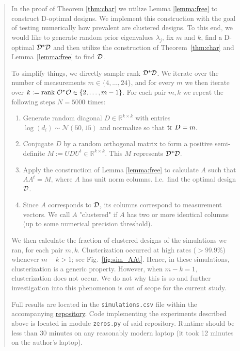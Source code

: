 \begin{quote}
  In the proof of Theorem \ref{thm:char} we utilize Lemma
  \ref{lemma:free} to construct D-optimal designs. We implement this
  construction with the goal of testing numerically how prevalent are
  clustered designs. To this end, we would like to generate random
  prior eigenvalues $\lambda_j$, fix $m$ and $k$, find a D-optimal
  $\mathcal{D}^*\mathcal{D}$ and then utilize the construction of
  Theorem~\ref{thm:char} and Lemma~\ref{lemma:free} to find $\mathcal{D}$.


  To simplify things, we directly sample rank $\mathcal{D}^*\mathcal{D}$. We iterate
  over the number of measurements $m \in \{4,\dots, 24\}$, and for
  every $m$ we then iterate over $k:=\textup{rank}\  \mathcal{O}^*\mathcal{O} \in \{2,\dots,
  m-1\}$. For each pair $m,k$ we repeat the following steps $N=5000$
  times:
  \begin{enumerate}
  \item Generate random diagonal $D\in \mathbb{R}^{k\times k}$ with
    entries $\log (d_i) \sim \mathcal{N}(50,15)$ and normalize so that
    $\textup{tr}\ D = m$.
  \item Conjugate $D$ by a random orthogonal matrix to form a positive
    semi-definite $M := UDU^t \in \mathbb{R}^{k\times k}$. This $M$
    represents $\mathcal{D}^*\mathcal{D}$.
  \item Apply the construction of Lemma \ref{lemma:free} to calculate
    $A$ such that $AA^t = M$, where $A$ has unit norm
    columns. I.e.~find the optimal design $\mathcal{D}$.
  \item Since $A$ corresponds to $\mathcal{D}$, its columns correspond to
    measurement vectors. We call $A$ "clustered" if $A$ has two or
    more identical columns (up to some numerical precision threshold).
  \end{enumerate}
  We then calculate the fraction of clustered designs of the simulations
  we ran, for each pair $m,k$. Clusterization occurred at high rates
  ($>99.9\%$) whenever $m-k > 1$; see Fig.~\ref{fig:sim_AAt}. Hence, in
  these simulations, clusterization is a generic property. However, when
  $m-k = 1$, clusterization does not occur. We do not why this is so and
  further investigation into this phenomenon is out of scope for the
  current study.
  
  Full results are located in the \texttt{simulations.csv} file within
  the accompanying \href{https://github.com/yairdaon/OED}{repository}.
  Code implementing the experiments described above is located in module
  \texttt{zeros.py} of said repository. Runtime should be less than 30
  minutes on any reasonably modern laptop (it took 12 minutes on the
  author's laptop).
\end{quote}

